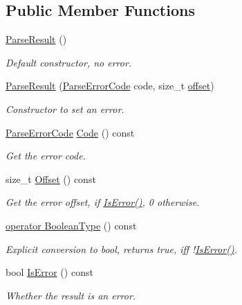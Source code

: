 \subsection*{Public Member Functions}
\begin{DoxyCompactItemize}
\item 
\hyperlink{structParseResult_acd4a266f815bec59fa27f64f1923fe9e}{Parse\+Result} ()
\begin{DoxyCompactList}\small\item\em Default constructor, no error. \end{DoxyCompactList}\item 
\hyperlink{structParseResult_a38ca49a53e80633d0864ad5026adaf84}{Parse\+Result} (\hyperlink{group__RAPIDJSON__ERRORS_ga8d4b32dfc45840bca189ade2bbcb6ba7}{Parse\+Error\+Code} code, size\+\_\+t \hyperlink{imgui__impl__opengl3__loader_8h_ae1b92ae085ddef4b1cdca7d749339fb0}{offset})
\begin{DoxyCompactList}\small\item\em Constructor to set an error. \end{DoxyCompactList}\item 
\hyperlink{group__RAPIDJSON__ERRORS_ga8d4b32dfc45840bca189ade2bbcb6ba7}{Parse\+Error\+Code} \hyperlink{structParseResult_a2aae3c2f42b31cc2409ee1e03bc4852e}{Code} () const
\begin{DoxyCompactList}\small\item\em Get the error code. \end{DoxyCompactList}\item 
size\+\_\+t \hyperlink{structParseResult_afbe762766ac21b2aae266105f1dfa643}{Offset} () const
\begin{DoxyCompactList}\small\item\em Get the error offset, if \hyperlink{structParseResult_adfe0ef5b994e82f8aa9ebf0b30c924b1}{Is\+Error()}, 0 otherwise. \end{DoxyCompactList}\item 
\hyperlink{structParseResult_abcd534680e4067ab797b1c6e930ac91c}{operator Boolean\+Type} () const
\begin{DoxyCompactList}\small\item\em Explicit conversion to {\ttfamily bool}, returns {\ttfamily true}, iff !\hyperlink{structParseResult_adfe0ef5b994e82f8aa9ebf0b30c924b1}{Is\+Error()}. \end{DoxyCompactList}\item 
bool \hyperlink{structParseResult_adfe0ef5b994e82f8aa9ebf0b30c924b1}{Is\+Error} () const
\begin{DoxyCompactList}\small\item\em Whether the result is an error. \end{DoxyCompactList}\item 

\end{DoxyCompactItemize}
